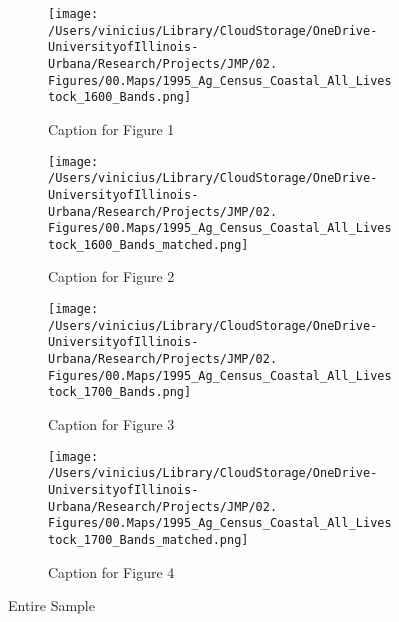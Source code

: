 \documentclass[11pt]{article}
\begin{document}

\clearpage

\begin{landscape}
  \begin{figure}[htbp]
    \centering
    \begin{subfigure}[b]{0.65\textwidth}
        \centering
        \texttt{[image: /Users/vinicius/Library/CloudStorage/OneDrive-UniversityofIllinois-Urbana/Research/Projects/JMP/02. Figures/00.Maps/1995\_Ag\_Census\_Coastal\_All\_Livestock\_1600\_Bands.png]}
        \caption{Caption for Figure 1}
        \label{fig:fig1}
    \end{subfigure}
    \hfill
    \begin{subfigure}[b]{0.65\textwidth}
        \centering
        \texttt{[image: /Users/vinicius/Library/CloudStorage/OneDrive-UniversityofIllinois-Urbana/Research/Projects/JMP/02. Figures/00.Maps/1995\_Ag\_Census\_Coastal\_All\_Livestock\_1600\_Bands\_matched.png]}
        \caption{Caption for Figure 2}
        \label{fig:fig2}
    \end{subfigure}

    \vspace{0.1cm} %

    \begin{subfigure}[b]{0.65\textwidth}
        \centering
        \texttt{[image: /Users/vinicius/Library/CloudStorage/OneDrive-UniversityofIllinois-Urbana/Research/Projects/JMP/02. Figures/00.Maps/1995\_Ag\_Census\_Coastal\_All\_Livestock\_1700\_Bands.png]}
        \caption{Caption for Figure 3}
        \label{fig:fig3}
    \end{subfigure}
    \hfill
    \begin{subfigure}[b]{0.65\textwidth}
        \centering
        \texttt{[image: /Users/vinicius/Library/CloudStorage/OneDrive-UniversityofIllinois-Urbana/Research/Projects/JMP/02. Figures/00.Maps/1995\_Ag\_Census\_Coastal\_All\_Livestock\_1700\_Bands\_matched.png]}
        \caption{Caption for Figure 4}
        \label{fig:fig4}
    \end{subfigure}

    \vspace{1cm}

    \caption{Entire Sample}
    \label{fig:robustness_all_distance_cutoff}
    
\end{figure}
\end{landscape}
\end{document}
